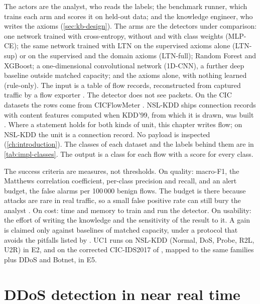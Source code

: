 The actors are the analyst, who reads the labels; the benchmark runner, which
trains each arm and scores it on held-out data; and the knowledge engineer, who
writes the axioms (\cref{sec:kb-design}). The arms are the detectors under
comparison: one network trained with cross-entropy, without and with class weights
(MLP-CE); the same network trained with LTN on the supervised axioms alone (LTN-sup)
or on the supervised and the domain axioms (LTN-full); Random Forest and XGBoost; a
one-dimensional convolutional network (1D-CNN), a further deep baseline outside matched
capacity; and the axioms alone, with nothing learned (rule-only). The input is a table of flow records,
reconstructed from captured traffic by a flow exporter \citep{claise2013rfc7011}.
The detector does not see packets. On the CIC datasets the rows come from
CICFlowMeter \citep{sharafaldin2018cicids2017,cic2019ddos}. NSL-KDD ships connection records
with content features computed when KDD'99, from which it is drawn, was built
\citep{tavallaee2009kddcup99}. Where a statement holds for both kinds of unit, this
chapter writes flow; on NSL-KDD the unit is a connection record. No payload is
inspected (\cref{ch:introduction}).
The classes of each dataset and the labels behind them are in \cref{tab:impl-classes}.
The output is a class for each flow with a score for every class.

The success criteria are measures, not thresholds. On quality: macro-F1, the
Matthews correlation coefficient, per-class precision and recall, and an alert
budget, the false alarms per 100\,000 benign flows. The budget is there because
attacks are rare in real traffic, so a small false positive rate can still bury
the analyst \citep{axelsson2000baserate}. On cost: time and memory to train and
run the detector. On usability: the effort of writing the knowledge and the
sensitivity of the result to it. A gain is claimed only against baselines of
matched capacity, under a protocol that avoids the pitfalls listed by
\citet{arp2022dosdonts}. UC1 runs on NSL-KDD (Normal, DoS, Probe, R2L, U2R) in
E2, and on the corrected CIC-IDS2017 of \citet{liu2022error}, mapped to
the same families plus DDoS and Botnet, in E5.

\section{DDoS detection in near real time}
\label{sec:uc2}

